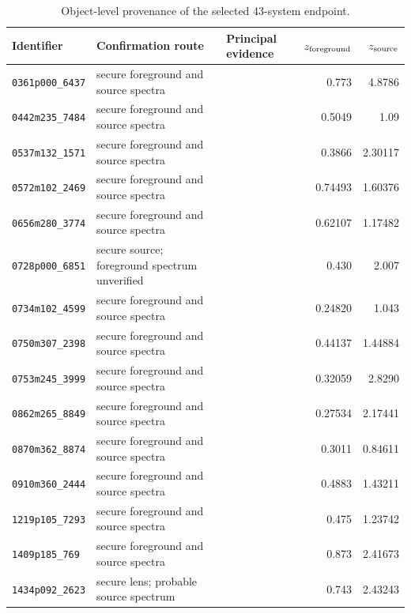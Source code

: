 \begin{table}
\centering
\caption{Object-level provenance of the selected 43-system endpoint.}
\label{tab:confirmed_43_provenance}
{\scriptsize
\setlength{\tabcolsep}{3pt}
\renewcommand{\arraystretch}{0.92}
\begin{tabular}{p{}p{}p{}rr}
\toprule
Identifier & Confirmation route & Principal evidence & $z_{\rm foreground}$ & $z_{\rm source}$ \\
\midrule
\texttt{0361p000\_6437} & secure foreground and source spectra & \citep{Gladders2002,Gladders2003} & 0.773 & 4.8786 \\
\texttt{0442m235\_7484} & secure foreground and source spectra & \citep{Zitrin2011,Nakane2025} & 0.5049 & 1.09 \\
\texttt{0537m132\_1571} & secure foreground and source spectra & \citep{Lin2026} & 0.3866 & 2.30117 \\
\texttt{0572m102\_2469} & secure foreground and source spectra & \citep{Lin2026} & 0.74493 & 1.60376 \\
\texttt{0656m280\_3774} & secure foreground and source spectra & \citep{Lin2026} & 0.62107 & 1.17482 \\
\texttt{0728p000\_6851} & secure source; foreground spectrum unverified & \citep{Sand2005} & 0.430 & 2.007 \\
\texttt{0734m102\_4599} & secure foreground and source spectra & \citep{Richard2010,Lin2026} & 0.24820 & 1.043 \\
\texttt{0750m307\_2398} & secure foreground and source spectra & \citep{Lin2026} & 0.44137 & 1.44884 \\
\texttt{0753m245\_3999} & secure foreground and source spectra & \citep{Lin2026} & 0.32059 & 2.8290 \\
\texttt{0862m265\_8849} & secure foreground and source spectra & \citep{Lin2026} & 0.27534 & 2.17441 \\
\texttt{0870m362\_8874} & secure foreground and source spectra & \citep{Lin2026} & 0.3011 & 0.84611 \\
\texttt{0910m360\_2444} & secure foreground and source spectra & \citep{Lin2026} & 0.4883 & 1.43211 \\
\texttt{1219p105\_7293} & secure foreground and source spectra & \citep{Huang2026,Lin2026,Tran2022} & 0.475 & 1.23742 \\
\texttt{1409p185\_769} & secure foreground and source spectra & \citep{Huang2026,Tran2022} & 0.873 & 2.41673 \\
\texttt{1434p092\_2623} & secure lens; probable source spectrum & \citep{Tran2022} & 0.743 & 2.43243 \\

\end{tabular}}
\end{table}
